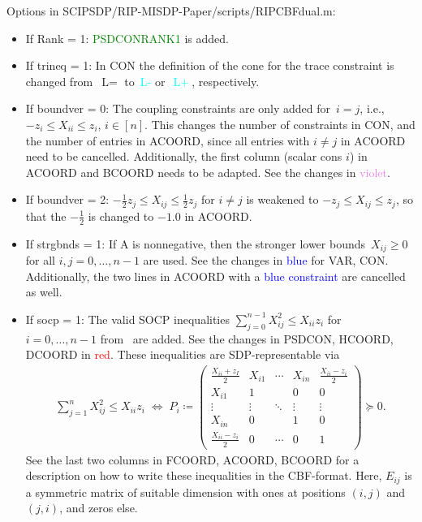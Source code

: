 \documentclass[11pt,a4paper]{article}
\newcommand{\define}{\coloneqq}
\theoremstyle{definition}
\begin{document}
Options in \textsf{SCIPSDP/RIP-MISDP-Paper/scripts/RIPCBFdual.m}:
\begin{itemize}
\item If Rank = 1: \textcolor{green}{PSDCONRANK1} is added.
\item If trineq = 1: In CON the definition of the cone for the trace
  constraint is changed from~$\text{L}=$ to~\textcolor{cyan}{$\text{L-}$}
  or~\textcolor{cyan}{$\text{L}+$}, respectively.
\item If boundver = 0: The coupling constraints are only added for~$i = j$,
  i.e., {\color{violet} $-z_i \leq X_{ii} \leq z_i$, $i \in [n]$}. This
  changes the number of constraints in CON, and the number of entries in
  ACOORD, since all entries with $i \neq j$ in ACOORD need to be
  cancelled. Additionally, the first column (scalar cons $i$) in ACOORD and
  BCOORD needs to be adapted. See the changes in
  \textcolor{violet}{violet}.
\item If boundver = 2: {\color{orange}
    $-\tfrac{1}{2}z_j \leq X_{ij} \leq \tfrac{1}{2}z_j$ for $i \neq j$} is
  weakened to {\color{orange}$-z_j \leq X_{ij} \leq z_j$}, so that the
  {\color{orange} $-\tfrac{1}{2}$} is changed to $-1.0$ in ACOORD.
\item If strgbnds = 1: If A is nonnegative, then the stronger lower
  bounds~$X_{ij} \geq 0$ for all $i,j =0,\dots,n-1$ are used. See the
  changes in \textcolor{blue}{blue} for VAR, CON. Additionally, the two
  lines in ACOORD with a \textcolor{blue}{blue constraint} are cancelled
  as well.
\item If socp = 1: The valid SOCP inequalities
  $\sum_{j=0}^{n-1}X_{ij}^2 \leq X_{ii}z_i$ for $i = 0,\dots,n-1$
  from~\cite{LiX20} are added. See the changes in PSDCON, HCOORD, DCOORD in
  \textcolor{red}{red}. These inequalities are SDP-representable via
  \begin{align*}
    \sum_{j=1}^n X_{ij}^2 \leq X_{ii}z_i \; \Leftrightarrow \;
    P_i \define \begin{pmatrix}
      \tfrac{X_{ii}+z_I}{2} & X_{i1} & \cdots & X_{in} & \tfrac{X_{ii}-z_i}{2}
      \\
      X_{i1} & 1 & & 0 & 0 \\
      \vdots &\vdots & \ddots & \vdots & \vdots \\
      X_{in} & 0 & & 1 & 0 \\
      \tfrac{X_{ii}-z_i}{2} & 0 & \cdots & 0 & 1
    \end{pmatrix} \succeq 0.
  \end{align*}
  See the last two columns in FCOORD, ACOORD, BCOORD for a description on
  how to write these inequalities in the CBF-format. Here, $E_{ij}$ is a
  symmetric matrix of suitable dimension with ones at positions $(i,j)$ and
  $(j,i)$, and zeros else.
\end{itemize}
\end{document}
